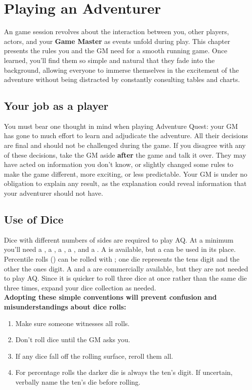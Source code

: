 \chapter{Playing an Adventurer}
\label{ch:play-adventurer}
An \aq game session revolves about the interaction between you, other players, actors, and your \textbf{Game Master} as events unfold during play. This chapter presents the rules you and the GM need for a smooth running game. Once learned, you'll find them so simple and natural that they fade into the background, allowing everyone to immerse themselves in the excitement of the adventure without being distracted by constantly consulting tables and charts.
\setlength{\columnsep}{\defcolwidth}
\begin{multicols*}{2}
\section{Your job as a player}
You must bear one thought in mind when playing Adventure Quest: your GM has gone to much effort to learn and adjudicate the adventure. All their decisions are final and
should not be challenged during the game. If you disagree with any of these decisions, take the GM aside \textbf{after} the game and talk it over. They may have acted on information you don't know, or slightly changed some rules to make the game  different, more exciting, or less predictable. Your GM is under no obligation to explain any result, as the explanation could reveal information that your adventurer should not have.
\section{Use of Dice}
Dice with different numbers of sides are required to play AQ. At a minimum you'll need a , a , a , a , and a . A  is available, but a  can be used in its
place. Percentile rolls () can be rolled with  ; one die represents the tens digit and the other the ones digit. A  and a  are commercially available, but they are not needed to play AQ. Since it is quicker to roll three dice at once rather
than the same die three times, expand your dice collection as needed.\\
\textbf{Adopting these simple conventions will prevent confusion and misunderstandings about dice rolls:}
\begin{enumerate}[leftmargin=12pt]
\item Make sure someone witnesses all rolls.
\item Don't roll dice until the GM asks you.
\item If any dice fall off the rolling surface, reroll them all.
\item For percentage rolls the darker die is always the ten's digit. If uncertain, verbally name the ten's die before rolling.
\end{enumerate}

\end{multicols*}
